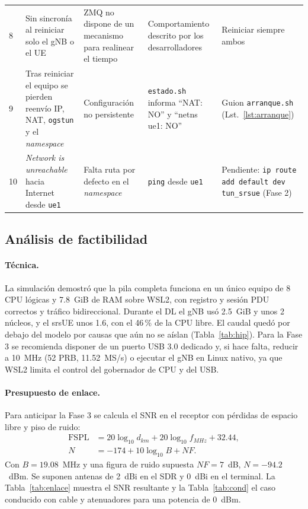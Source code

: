 \documentclass[conference]{IEEEtran}
\begin{document}
\begin{table}[!t]
\begin{tabular}{p{0.5cm}p{3.5cm}p{4.2cm}p{4.3cm}p{4.4cm}}
8 & Sin sincronía al reiniciar solo el gNB o el UE & ZMQ no dispone de un mecanismo para realinear el tiempo \cite{srsrandisc} & Comportamiento descrito por los desarrolladores & Reiniciar siempre ambos \\
9 & Tras reiniciar el equipo se pierden reenvío IP, NAT, \texttt{ogstun} y el \textit{namespace} & Configuración no persistente & \texttt{estado.sh} informa ``NAT: NO'' y ``netns ue1: NO'' & Guion \texttt{arranque.sh} (Lst.~\ref{lst:arranque}) \\
10 & \textit{Network is unreachable} hacia Internet desde \texttt{ue1} & Falta ruta por defecto en el \textit{namespace} & \texttt{ping} desde \texttt{ue1} & Pendiente: \texttt{ip route add default dev tun\_srsue} (Fase 2) \\
\bottomrule
\end{tabular}
\end{table}

\subsection{Análisis de factibilidad}
\paragraph{Técnica.} La simulación demostró que la pila completa funciona en un único equipo de 8 CPU lógicas y 7.8~GiB de RAM sobre WSL2, con registro y sesión PDU correctos y tráfico bidireccional. Durante el DL el gNB usó 2.5~GiB y unos 2 núcleos, y el srsUE unos 1.6, con el 46\,\% de la CPU libre. El caudal quedó por debajo del modelo por causas que aún no se aíslan (Tabla~\ref{tab:hip}). Para la Fase 3 se recomienda disponer de un puerto USB 3.0 dedicado y, si hace falta, reducir a 10~MHz (52 PRB, 11.52~MS/s) o ejecutar el gNB en Linux nativo, ya que WSL2 limita el control del gobernador de CPU y del USB.

\paragraph{Presupuesto de enlace.} Para anticipar la Fase 3 se calcula el SNR en el receptor con pérdidas de espacio libre y piso de ruido:
\begin{align}
\mathrm{FSPL}&=20\log_{10}d_{km}+20\log_{10}f_{MHz}+32.44,\\
N&=-174+10\log_{10}B+NF.
\end{align}
Con $B=19.08$~MHz y una figura de ruido supuesta $NF=7$~dB, $N=-94.2$~dBm. Se suponen antenas de 2~dBi en el SDR y 0~dBi en el terminal. La Tabla~\ref{tab:enlace} muestra el SNR resultante y la Tabla~\ref{tab:cond} el caso conducido con cable y atenuadores para una potencia de 0~dBm.
\end{document}
